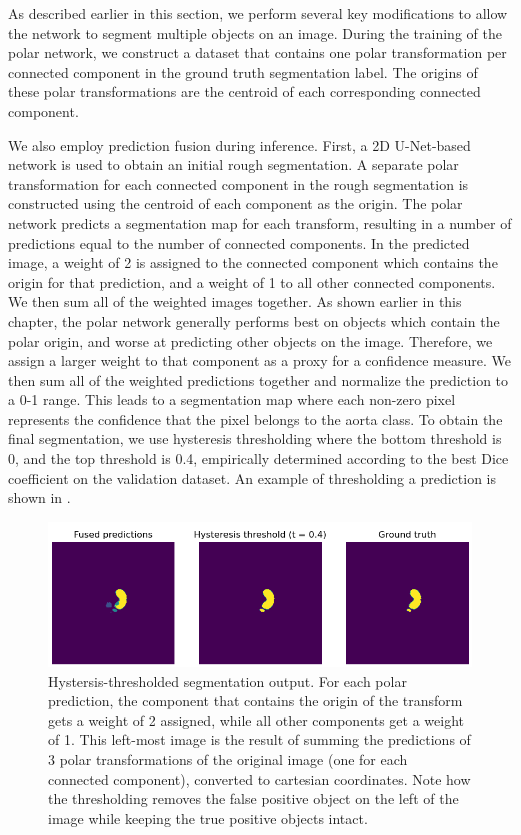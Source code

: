 As described earlier in this section, we perform several key modifications to allow the network to segment multiple objects on an image. During the training of the polar network, we construct a dataset that contains one polar transformation per connected component in the ground truth segmentation label. The origins of these polar transformations are the centroid of each corresponding connected component.

We also employ prediction fusion during inference. First, a 2D U-Net-based network is used to obtain an initial rough segmentation. A separate polar transformation for each connected component in the rough segmentation is constructed using the centroid of each component as the origin. The polar network predicts a segmentation map for each transform, resulting in a number of predictions equal to the number of connected components. In the predicted image, a weight of 2 is assigned to the connected component which contains the origin for that prediction, and a weight of 1 to all other connected components. We then sum all of the weighted images together. As shown earlier in this chapter, the polar network generally performs best on objects which contain the polar origin, and worse at predicting other objects on the image. Therefore, we assign a larger weight to that component as a proxy for a confidence measure. We then sum all of the weighted predictions together and normalize the prediction to a 0-1 range. This leads to a segmentation map where each non-zero pixel represents the confidence that the pixel belongs to the aorta class. To obtain the final segmentation, we use hysteresis thresholding where the bottom threshold is 0, and the top threshold is 0.4, empirically determined according to the best Dice coefficient on the validation dataset. An example of thresholding a prediction is shown in .

\begin{figure}[h]
\centering
\includegraphics[width=0.8\columnwidth]{images/4/hyst}
\caption{Hystersis-thresholded segmentation output. For each polar prediction, the component that contains the origin of the transform gets a weight of 2 assigned, while all other components get a weight of 1. This left-most image is the result of summing the predictions of 3 polar transformations of the original image (one for each connected component), converted to cartesian coordinates. Note how the thresholding removes the false positive object on the left of the image while keeping the true positive objects intact. \cite{bencevicUsingPolarTransform2022a}}
\label{fig:thresh}
\end{figure}

